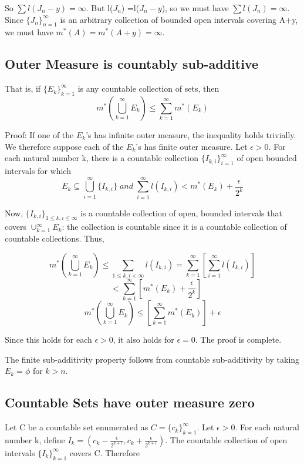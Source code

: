 \documentclass{article}
\begin{document}
So $\sum l(J_n - y) =\infty$. But l($J_n$) =l($J_n - y$), so we must have $\sum l(J_n) =\infty$. Since $\{J_n\}_{n=1}^{\infty} $ is an arbitrary collection of bounded open intervals covering A+y, we must have $m^*(A)=m^*(A+y)= \infty$. 

\subsection{Outer Measure is countably sub-additive}

That is, if $\{E_k\}_{k=1}^{\infty} $ is any countable collection of sets, then
$$ m^*(\bigcup_{k=1}^{\infty} E_k) \leq \sum_{k=1}^{\infty} m^{*}(E_k)$$

Proof: If one of the $E_k$'s has infinite outer measure, the inequality holds trivially. We therefore suppose each of the $E_k$'s has finite outer measure. Let $\epsilon > 0$. For each natural number k, there is a countable collection $\{ I_{k,i} \}_{i=1}^{\infty}$ of open bounded intervals for which
$$ E_k \subseteq \bigcup_{i=1}^{\infty} \{ I_{k,i} \} \; and \; \sum_{i=1}^{\infty} l(I_{k,i}) < m^{*}(E_k) +\frac{\epsilon}{2^k}  $$

Now, $\{I_{k,i}\}_{1 \leq k , i \leq \infty}$ is a countable collection of open, bounded intervals that covers $\cup_{k=1}^{\infty} E_k$: the collection is countable since it is a countable collection of countable collections. Thus,

$$ m^{*}(\bigcup_{k=1}^{\infty} E_k) \leq \sum_{1\leq k,i<\infty } l(I_{k,i})= \sum_{k=1}^{\infty}[\sum_{i=1}^{\infty} l(I_{k,i})]$$
$$\;\;\;<\sum_{k=1}^{\infty}[m^{*}(E_k) + \frac{\epsilon}{2^k}]$$
$$  m^{*}(\bigcup_{k=1}^{\infty} E_k) \leq [\sum_{k=1}^{\infty}m^{*}(E_k)]+\epsilon$$

Since this holds for each $\epsilon>0$, it also holds for $\epsilon=0$. The proof is complete.

The finite sub-additivity property follows from countable sub-additivity by taking $E_k = \phi$ for $k>n$.

\subsection{Countable Sets have outer measure zero}
Let C be a  countable set enumerated as $C=\{c_k\}_{k=1}^\infty$. Let $\epsilon>0.$ For each natural number k, define $I_k=(c_k-{\frac{\epsilon}{2^{k+1}}},c_k+{\frac{\epsilon}{2^{k+1}}}).$ The countable collection of open intervals $\{I_k\}_{k=1}^\infty$ covers C. Therefore
\end{document}
